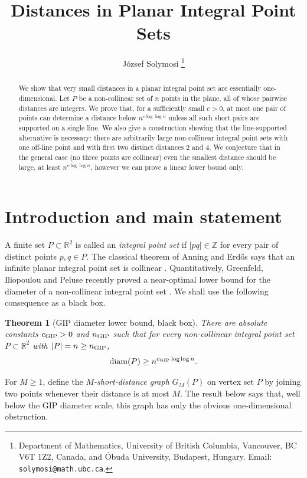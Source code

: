 \documentclass[11pt]{article}
\title{Distances in Planar Integral Point Sets}
\author{J\'ozsef Solymosi%
\thanks{Department of Mathematics, University of British Columbia, Vancouver, BC V6T 1Z2, Canada, and Óbuda University, Budapest, Hungary.
Email: \texttt{solymosi@math.ubc.ca}.}}
\date{}
\newtheorem{theorem}{Theorem}[section]
\newcommand{\diam}{\operatorname{diam}}
\newcommand{\ZZ}{\mathbb Z}
\newcommand{\RR}{\mathbb R}
\begin{document}
\maketitle

\begin{abstract}
We show that very small distances in a planar
integral point set are essentially one-dimensional.  Let \(P\) be a
non-collinear set of \(n\) points in the plane, all of whose pairwise distances
are integers. We prove that, for a sufficiently small $c>0$, at most one pair of points can determine a distance below $n^{c\log\log{n}}$ unless all such
short pairs are supported on a single line.  We also give a
construction showing that the line-supported
alternative is necessary: there are arbitrarily large non-collinear integral
point sets with one off-line point and with first two distinct distances
\(2\) and \(4\). We conjecture that in the general case (no three points are collinear)
even the smallest distance should be large, at least $n^{c\log\log{n}}$, however we can prove a linear lower bound only.
\end{abstract}

\section{Introduction and main statement}

A finite set \(P\subset \RR^2\) is called an \emph{integral point set} if
\(|pq|\in\ZZ\) for every pair of distinct points \(p,q\in P\).  The classical
theorem of Anning and Erd\H{o}s says that an infinite planar integral point set is
collinear \cite{AnningErdos}.  Quantitatively, Greenfeld, Iliopoulou and Peluse
recently proved a near-optimal lower bound for the diameter of a non-collinear
integral point set \cite{GIP}.  We shall use the following consequence as a
black box.

\begin{theorem}[GIP diameter lower bound, black box]\label{thm:gip}
There are absolute constants \(c_{\rm GIP}>0\) and \(n_{\rm GIP}\) such that
for every non-collinear integral point set \(P\subset \RR^2\) with
\(|P|=n\ge n_{\rm GIP}\),
\[
        \diam(P) \ge n^{c_{\rm GIP}\log\log n}.
\]
\end{theorem}

For \(M\ge 1\), define the \emph{\(M\)-short-distance graph} \(G_M(P)\) on
vertex set \(P\) by joining two points whenever their distance is at most \(M\).
The result below says that, well below the GIP diameter scale, this graph has
only the obvious one-dimensional obstruction.
\end{document}
